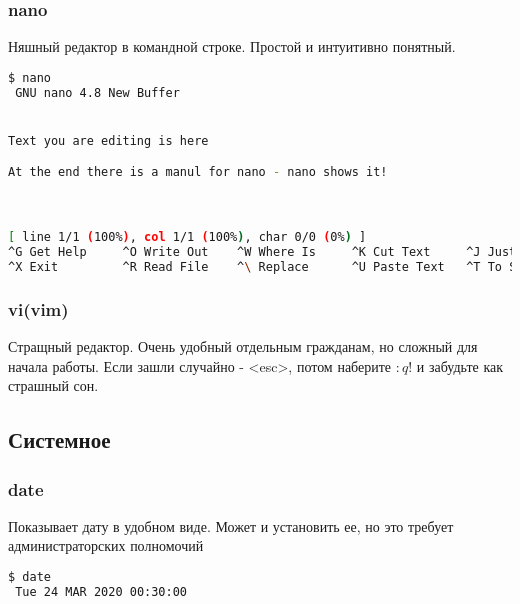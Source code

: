 \documentclass[11pt]{article}
\begin{document}
\subsubsection{nano}
Няшный редактор в командной строке. Простой и интуитивно понятный.
 \begin{lstlisting}[language=bash]
 $ nano
 GNU nano 4.8 New Buffer


Text you are editing is here

At the end there is a manul for nano - nano shows it!



[ line 1/1 (100%), col 1/1 (100%), char 0/0 (0%) ]
^G Get Help     ^O Write Out    ^W Where Is     ^K Cut Text     ^J Justify      ^C Cur Pos      M-U Undo       
^X Exit         ^R Read File    ^\ Replace      ^U Paste Text   ^T To Spell     ^_ Go To Line   M-E Redo       
\end{lstlisting}

\subsubsection{vi(vim)}
Стращный редактор. Очень удобный отдельным гражданам, но сложный для начала работы. Если зашли случайно - <esc>, потом наберите $:q!$ и забудьте как страшный сон.

\subsection{Системное}

\subsubsection{date}
Показывает дату в удобном виде. Может и установить ее, но это требует администраторских полномочий

\begin{lstlisting}[language=bash]
 $ date
 Tue 24 MAR 2020 00:30:00
\end{lstlisting}
\end{document}
